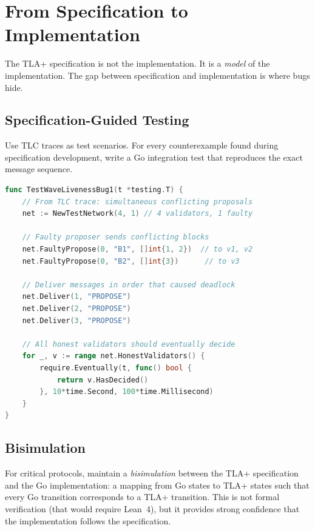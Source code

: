 \section{From Specification to Implementation}


The TLA+ specification is not the implementation. It is a \emph{model} of the
implementation. The gap between specification and implementation is where bugs hide.

\subsection{Specification-Guided Testing}

Use TLC traces as test scenarios. For every counterexample found during specification
development, write a Go integration test that reproduces the exact message sequence.

\begin{lstlisting}[language=Go,caption={Go test derived from TLC counterexample trace}]
func TestWaveLivenessBug1(t *testing.T) {
    // From TLC trace: simultaneous conflicting proposals
    net := NewTestNetwork(4, 1) // 4 validators, 1 faulty

    // Faulty proposer sends conflicting blocks
    net.FaultyPropose(0, "B1", []int{1, 2})  // to v1, v2
    net.FaultyPropose(0, "B2", []int{3})      // to v3

    // Deliver messages in order that caused deadlock
    net.Deliver(1, "PROPOSE")
    net.Deliver(2, "PROPOSE")
    net.Deliver(3, "PROPOSE")

    // All honest validators should eventually decide
    for _, v := range net.HonestValidators() {
        require.Eventually(t, func() bool {
            return v.HasDecided()
        }, 10*time.Second, 100*time.Millisecond)
    }
}
\end{lstlisting}

\subsection{Bisimulation}

For critical protocols, maintain a \emph{bisimulation} between the TLA+ specification
and the Go implementation: a mapping from Go states to TLA+ states such that every
Go transition corresponds to a TLA+ transition. This is not formal verification (that
would require Lean~4), but it provides strong confidence that the implementation follows
the specification.

